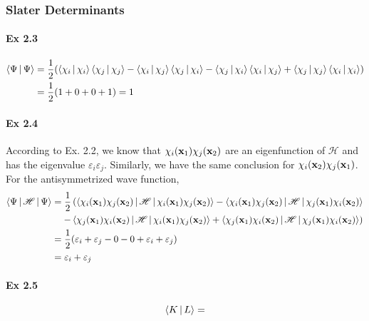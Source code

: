 \documentclass[a4paper]{article}
\newcommand{\ex}[1]{\paragraph{Ex #1}}
\numberwithin{equation}{subsection}
\begin{document}
\subsubsection{Slater Determinants}
\ex{2.3}
\begin{equation}\label{key}
\begin{aligned}
\Braket{\Psi | \Psi} 
&= \dfrac{1}{2}\qty(\Braket{\chi_i|\chi_i}\Braket{\chi_j|\chi_j} - \Braket{\chi_i|\chi_j}\Braket{\chi_j|\chi_i} - \Braket{\chi_j|\chi_i}\Braket{\chi_i|\chi_j} + \Braket{\chi_j|\chi_j}\Braket{\chi_i|\chi_i})\\
&= \dfrac{1}{2}(1+0+0+1) = 1
\end{aligned}
\end{equation}
\ex{2.4}
According to Ex. 2.2, we know that $ \chi_i(\vb{x}_1)\chi_j(\vb{x}_2) $ are an eigenfunction of $ \mathscr{H} $ and has the eigenvalue $ \varepsilon_i \varepsilon_j $. Similarly, we have the same conclusion for $ \chi_i(\vb{x}_2)\chi_j(\vb{x}_1) $.\\
For the antisymmetrized wave function,
\begin{equation}\label{key}
\begin{aligned}
\Braket{\Psi | \mathscr{H} | \Psi} &= \dfrac{1}{2}\left(\Braket{\chi_i(\vb{x}_1)\chi_j(\vb{x}_2) | \mathscr{H} | \chi_i(\vb{x}_1)\chi_j(\vb{x}_2)} - \Braket{\chi_i(\vb{x}_1)\chi_j(\vb{x}_2) | \mathscr{H} | \chi_j(\vb{x}_1)\chi_i(\vb{x}_2)}\right.\\
&\left. \quad - \Braket{\chi_j(\vb{x}_1)\chi_i(\vb{x}_2) | \mathscr{H} | \chi_i(\vb{x}_1)\chi_j(\vb{x}_2)} + \Braket{\chi_j(\vb{x}_1)\chi_i(\vb{x}_2) | \mathscr{H} | \chi_j(\vb{x}_1)\chi_i(\vb{x}_2)}\right)\\
&= \dfrac{1}{2}\qty(\varepsilon_i + \varepsilon_j - 0 - 0 + \varepsilon_i + \varepsilon_j)\\
&= \varepsilon_i + \varepsilon_j
\end{aligned}
\end{equation}

\ex{2.5}
\begin{equation}\label{key}
\Braket{K | L} = 
\end{equation}
\end{document}
